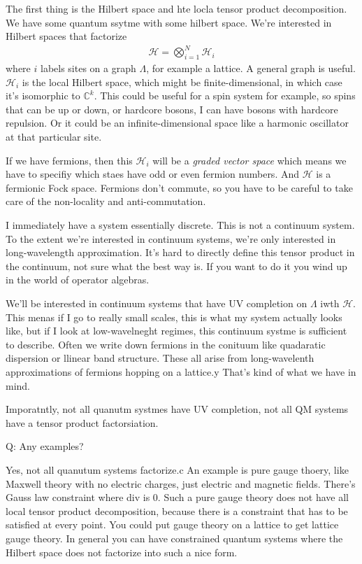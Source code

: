 The first thing is the Hilbert space and hte locla tensor product decomposition.
We have some quantum ssytme with some hilbert space.
We're interested in Hilbert spaces that factorize
\begin{align}
    \mathcal{H} = \bigotimes_{i=1}^{N}\mathcal{H}_i
\end{align}
where $i$ labels sites on a graph $\Lambda$, for example a lattice.
A general graph is useful.
$\mathcal{H}_i$ is the local Hilbert space, which might be finite-dimensional,
in which case it's isomorphic to $\mathbb{C}^k$.
This could be useful for a spin system for example,
so spins that can be up or down, 
or hardcore bosons, I can have bosons with hardcore repulsion.
Or it could be an infinite-dimensional space like a harmonic oscillator at that
particular site.

If we have fermions, then this $\mathcal{H}_i$ will be a \emph{graded vector
space}
which means we have to specifiy which staes have odd or even fermion numbers.
And $\mathcal{H}$ is a fermionic Fock space.
Fermions don't commute, so you have to be careful to take care of the
non-locality and anti-commutation.

I immediately have a system essentially discrete.
This is not a continuum system.
To the extent we're interested in continuum systems,
we're only interested in long-wavelength approximation.
It's hard to directly define this tensor product in the continuum,
not sure what the best way is.
If you want to do it you wind up in the world of operator algebras.

We'll be interested in continuum systems that have UV completion on $\Lambda$
iwth $\mathcal{H}$.
This menas if I go to really small scales, this is what my system actually looks
like, but if I look at low-wavelneght regimes, this continuum systme is
sufficient to describe.
Often we write down fermions in the conituum like quadaratic dispersion or
llinear band structure.
These all arise from long-wavelenth approximations of fermions hopping on a
lattice.y
That's kind of what we have in mind.

Imporatntly, not all quanutm systmes have UV completion, not all QM systems
have a tensor product factorsiation.

Q: Any examples?

Yes, not all quanutum systems factorize.c
An example is pure gauge thoery, like Maxwell theory with no electric charges,
just electric and magnetic fields.
There's Gauss law constraint where div is 0.
Such a pure gauge theory does not have all local tensor product decomposition,
because there is a constraint that has to be satisfied at every point.
You could put gauge theory on a lattice to get lattice gauge theory.
In general you can have constrained quantum systems where the Hilbert space does
not factorize into such a nice form.

